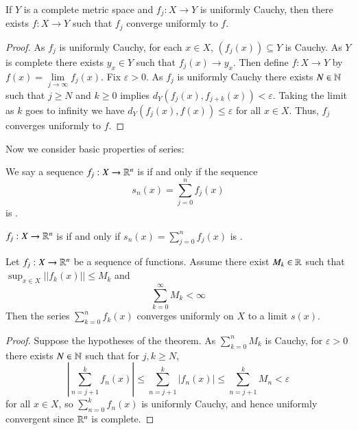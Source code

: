 \begin{prop}\label{prop:3.2.2}
    If $Y$ is a complete metric space and $f_j:X\rightarrow Y$ is uniformly Cauchy, then there exists $f:X\rightarrow Y$ such that $f_j$ converge uniformly to $f$.
\end{prop}
\begin{proof}
    As $f_j$ is uniformly Cauchy, for each $x \in X$, $(f_j(x)) \subseteq Y$ is Cauchy. As $Y$ is complete there exists $y_x \in Y$ such that $f_j(x)\rightarrow y_x$. Then define $f:X\rightarrow Y$ by $f(x) = \lim\limits_{j\rightarrow \infty}f_j(x)$. Fix $\varepsilon > 0$. As $f_j$ is uniformly Cauchy there exists $N \in \mathbb N$ such that $j \geq N$ and $k \geq 0$ implies $d_Y(f_j(x),f_{j+k}(x)) < \varepsilon$. Taking the limit as $k$ goes to infinity we have $d_Y(f_j(x),f(x)) \leq \varepsilon$ for all $x \in X$. Thus, $f_j$ converges uniformly to $f$.
\end{proof}


Now we consider basic properties of series: 

\begin{defn}
    We say a sequence $f_j:X\rightarrow \mathbb R^n$ is  if and only if the sequence \begin{equation*}
        s_n(x) = \sum_{j=0}^{n}f_j(x)
    \end{equation*}
    is .
\end{defn}

\begin{defn}
    $f_j:X\rightarrow \mathbb R^n$ is  if and only if $s_n(x) = \sum_{j=0}^nf_j(x)$ is .
\end{defn}

\begin{namthm}
    Let $f_j:X\rightarrow \mathbb R^n$ be a sequence of functions. Assume there exist $M_k \in \mathbb R$ such that $\sup_{x\in X}||f_k(x)|| \leq M_k$ and $$\sum_{k=0}^{\infty}M_k < \infty$$ Then the series $\sum_{k=0}^nf_k(x)$ converges uniformly on $X$ to a limit $s(x)$.
\end{namthm}
\begin{proof}
    Suppose the hypotheses of the theorem. As $\sum_{k=0}^nM_k$ is Cauchy, for $\varepsilon >0$ there exists $N \in \mathbb N$ such that for $j,k \geq N$, $$\left|\sum_{n=j+1}^kf_n(x)\right|\leq \sum_{n=j+1}^k|f_n(x)| \leq \sum_{n=j+1}^kM_n < \varepsilon$$ for all $x \in X$, so $\sum_{n=0}^kf_n(x)$ is uniformly Cauchy, and hence uniformly convergent since $\mathbb R^n$ is complete.
\end{proof}


